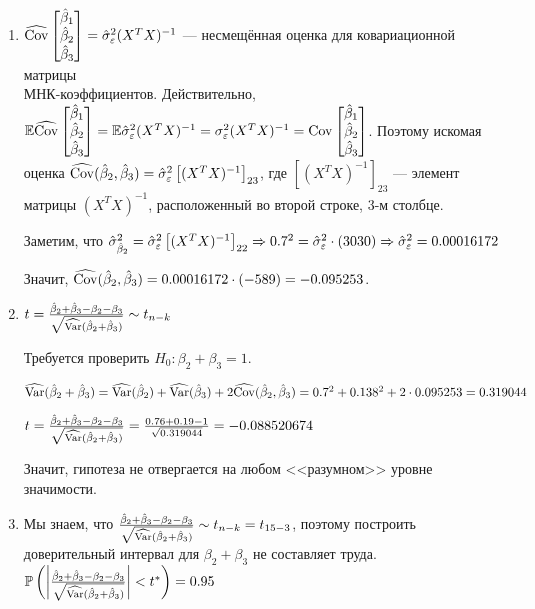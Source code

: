 \begin{solution}
\begin{enumerate}
\item $\widehat{\operatorname{Cov}}\begin{bmatrix}
\hat{\beta}_1 \\
\hat{\beta}_2 \\
\hat{\beta}_3 \\
\end{bmatrix} = \hat{\sigma}_{\varepsilon}^2 (X^TX)^{-1}$ --- несмещённая оценка для ковариационной матрицы \\ МНК-коэффициентов. Действительно, $\mathbb{E}\widehat{\operatorname{Cov}}\begin{bmatrix}
\hat{\beta}_1 \\
\hat{\beta}_2 \\
\hat{\beta}_3 \\
\end{bmatrix} = \mathbb{E}\hat{\sigma}_{\varepsilon}^2 (X^TX)^{-1} = \sigma_{\varepsilon}^2 (X^TX)^{-1} = \operatorname{Cov}\begin{bmatrix}
\hat{\beta}_1 \\
\hat{\beta}_2 \\
\hat{\beta}_3 \\
\end{bmatrix}$. Поэтому искомая оценка $\widehat{\operatorname{Cov}}(\hat{\beta}_2, \hat{\beta}_3) = \hat{\sigma}_{\varepsilon}^2 \left[ (X^T X)^{-1} \right]_{23}$, где $\left[ (X^T X)^{-1} \right]_{23}$ --- элемент матрицы $(X^T X)^{-1}$, расположенный во второй строке, 3-м столбце.

Заметим, что $\hat{\sigma}_{\hat{\beta}_2}^2 = \hat{\sigma}_{\varepsilon}^2 \left[ (X^T X)^{-1} \right]_{22} \Rightarrow 0.7^2 = \hat{\sigma}_{\varepsilon}^2 \cdot (3030) \Rightarrow \hat{\sigma}_{\varepsilon}^2 = 0.00016172$

Значит, $\widehat{\operatorname{Cov}}(\hat{\beta}_2, \hat{\beta}_3) = 0.00016172 \cdot (-589) = -0.095253$.

\item $t = \frac{\hat{\beta}_2 + \hat{\beta}_3 - \beta_2 - \beta_3}{\sqrt{\widehat{\operatorname{Var}}(\hat{\beta}_2 + \hat{\beta}_3)}} \sim t_{n-k}$

Требуется проверить $H_0: \beta_2 + \beta_3 = 1$.

$\widehat{\operatorname{Var}}(\hat{\beta}_2 + \hat{\beta}_3) = \widehat{\operatorname{Var}}(\hat{\beta}_2) + \widehat{\operatorname{Var}}(\hat{\beta}_3) + 2\widehat{\operatorname{Cov}}(\hat{\beta}_2, \hat{\beta}_3) = 0.7^2 + 0.138^2 + 2 \cdot 0.095253 = 0.319044$

$t = \frac{\hat{\beta}_2 + \hat{\beta}_3 - \beta_2 - \beta_3}{\sqrt{\widehat{\operatorname{Var}}(\hat{\beta}_2 + \hat{\beta}_3)}} = \frac{0.76 + 0.19 - 1}{\sqrt{0.319044}} = -0.088520674$

Значит, гипотеза не отвергается на любом <<разумном>> уровне значимости.

\item Мы знаем, что $\frac{\hat{\beta}_2 + \hat{\beta}_3 - \beta_2 - \beta_3}{\sqrt{\widehat{\operatorname{Var}}(\hat{\beta}_2 + \hat{\beta}_3)}} \sim t_{n-k} = t_{15-3}$, поэтому построить доверительный интервал для $\beta_2 + \beta_3$ не составляет труда. $\mathbb{P} \left( \left| \frac{\hat{\beta}_2 + \hat{\beta}_3 - \beta_2 - \beta_3}{\sqrt{\widehat{\operatorname{Var}}(\hat{\beta}_2 + \hat{\beta}_3)}} \right| < t^* \right) = 0.95$


\end{enumerate}
\end{solution}
